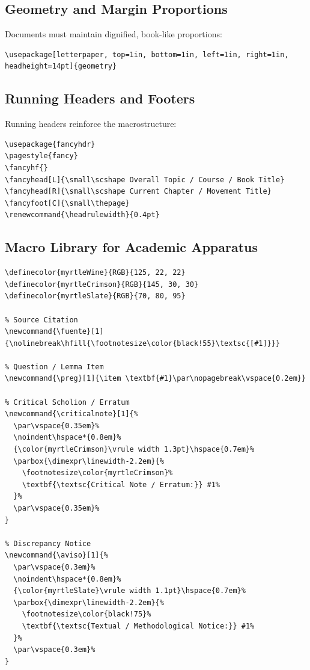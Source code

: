 \documentclass[11pt,letterpaper]{article}
\renewcommand{\headrulewidth}{0.4pt}
\newcommand{\scholion}[2]{%
  \par\vspace{0.3em}%
  \noindent\hspace*{0.8em}%
  {\color{#1}\vrule width 1.3pt}\hspace{0.7em}%
  \parbox{\dimexpr\linewidth-2.2em}{#2}%
  \par\vspace{0.3em}%
}
\newcommand{\criticalnote}[1]{\scholion{myrtleCrimson}{\footnotesize\color{myrtleCrimson}\textbf{\textsc{Critical Note / Erratum:}} #1}}
\begin{document}
\subsection{Geometry and Margin Proportions}
Documents must maintain dignified, book-like proportions:
\begin{lstlisting}
\usepackage[letterpaper, top=1in, bottom=1in, left=1in, right=1in, headheight=14pt]{geometry}
\end{lstlisting}

\subsection{Running Headers and Footers}
Running headers reinforce the macrostructure:
\begin{lstlisting}
\usepackage{fancyhdr}
\pagestyle{fancy}
\fancyhf{}
\fancyhead[L]{\small\scshape Overall Topic / Course / Book Title}
\fancyhead[R]{\small\scshape Current Chapter / Movement Title}
\fancyfoot[C]{\small\thepage}
\renewcommand{\headrulewidth}{0.4pt}
\end{lstlisting}

\subsection{Macro Library for Academic Apparatus}
\begin{lstlisting}
\definecolor{myrtleWine}{RGB}{125, 22, 22}
\definecolor{myrtleCrimson}{RGB}{145, 30, 30}
\definecolor{myrtleSlate}{RGB}{70, 80, 95}

% Source Citation
\newcommand{\fuente}[1]{\nolinebreak\hfill{\footnotesize\color{black!55}\textsc{[#1]}}}

% Question / Lemma Item
\newcommand{\preg}[1]{\item \textbf{#1}\par\nopagebreak\vspace{0.2em}}

% Critical Scholion / Erratum
\newcommand{\criticalnote}[1]{%
  \par\vspace{0.35em}%
  \noindent\hspace*{0.8em}%
  {\color{myrtleCrimson}\vrule width 1.3pt}\hspace{0.7em}%
  \parbox{\dimexpr\linewidth-2.2em}{%
    \footnotesize\color{myrtleCrimson}%
    \textbf{\textsc{Critical Note / Erratum:}} #1%
  }%
  \par\vspace{0.35em}%
}

% Discrepancy Notice
\newcommand{\aviso}[1]{%
  \par\vspace{0.3em}%
  \noindent\hspace*{0.8em}%
  {\color{myrtleSlate}\vrule width 1.1pt}\hspace{0.7em}%
  \parbox{\dimexpr\linewidth-2.2em}{%
    \footnotesize\color{black!75}%
    \textbf{\textsc{Textual / Methodological Notice:}} #1%
  }%
  \par\vspace{0.3em}%
}
\end{lstlisting}
\end{document}
